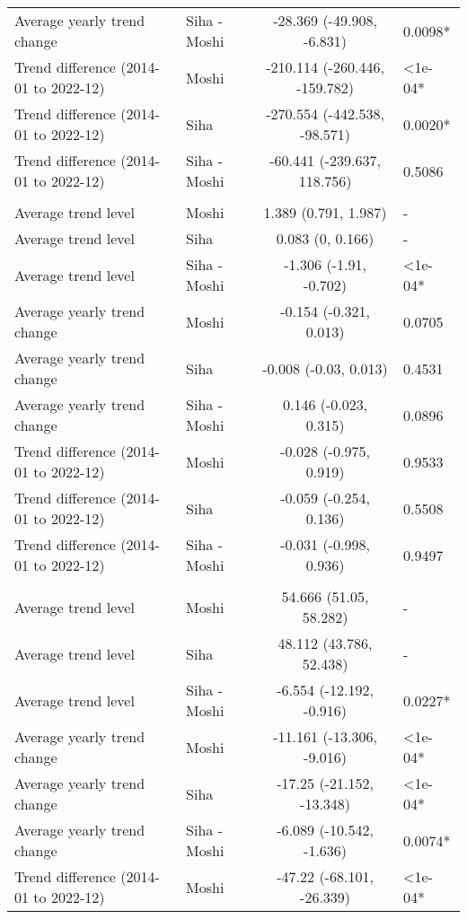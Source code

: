 \begin{longtable}{l|lcl}
Average yearly trend change & Siha - Moshi & -28.369 (-49.908, -6.831) & 0.0098* \\ 
Trend difference (2014-01 to 2022-12) & Moshi & -210.114 (-260.446, -159.782) & <1e-04* \\ 
Trend difference (2014-01 to 2022-12) & Siha & -270.554 (-442.538, -98.571) & 0.0020* \\ 
Trend difference (2014-01 to 2022-12) & Siha - Moshi & -60.441 (-239.637, 118.756) & 0.5086 \\ 
\midrule\addlinespace[2.5pt]
\multicolumn{4}{l}{Leprosy} \\ 
\midrule\addlinespace[2.5pt]
Average trend level & Moshi & 1.389 (0.791, 1.987) & - \\ 
Average trend level & Siha & 0.083 (0, 0.166) & - \\ 
Average trend level & Siha - Moshi & -1.306 (-1.91, -0.702) & <1e-04* \\ 
Average yearly trend change & Moshi & -0.154 (-0.321, 0.013) & 0.0705 \\ 
Average yearly trend change & Siha & -0.008 (-0.03, 0.013) & 0.4531 \\ 
Average yearly trend change & Siha - Moshi & 0.146 (-0.023, 0.315) & 0.0896 \\ 
Trend difference (2014-01 to 2022-12) & Moshi & -0.028 (-0.975, 0.919) & 0.9533 \\ 
Trend difference (2014-01 to 2022-12) & Siha & -0.059 (-0.254, 0.136) & 0.5508 \\ 
Trend difference (2014-01 to 2022-12) & Siha - Moshi & -0.031 (-0.998, 0.936) & 0.9497 \\ 
\midrule\addlinespace[2.5pt]
\multicolumn{4}{l}{Malaria} \\ 
\midrule\addlinespace[2.5pt]
Average trend level & Moshi & 54.666 (51.05, 58.282) & - \\ 
Average trend level & Siha & 48.112 (43.786, 52.438) & - \\ 
Average trend level & Siha - Moshi & -6.554 (-12.192, -0.916) & 0.0227* \\ 
Average yearly trend change & Moshi & -11.161 (-13.306, -9.016) & <1e-04* \\ 
Average yearly trend change & Siha & -17.25 (-21.152, -13.348) & <1e-04* \\ 
Average yearly trend change & Siha - Moshi & -6.089 (-10.542, -1.636) & 0.0074* \\ 
Trend difference (2014-01 to 2022-12) & Moshi & -47.22 (-68.101, -26.339) & <1e-04* \\ 

\end{longtable}
